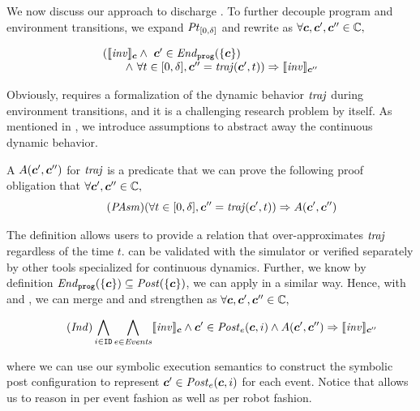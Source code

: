 We now discuss our approach to discharge .
To further decouple program and environment transitions,
we expand $\mathit{Pt}_{[0,\delta]}$  and rewrite  as $\forall \mathit{\boldsymbol{c}}, \mathit{\boldsymbol{c}}', \mathit{\boldsymbol{c}}'' \in \mathbb{C},$
\begin{small}
\begin{equation}\label{po:ind-hyp-traj}
\begin{array}{l}
(\llbracket\mathit{inv}\rrbracket_{\mathit{\boldsymbol{c}}} \land\ \mathit{\boldsymbol{c}}' \in \mathit{End}_{\mathtt{prog}}(\left\{\mathit{\boldsymbol{c}}\right\})\\
\qquad  \land\ \forall t \in [0, \delta], \mathit{\boldsymbol{c}}'' = \mathit{traj}(\mathit{\boldsymbol{c}}', t)) \Rightarrow \llbracket\mathit{inv}\rrbracket_{\mathit{\boldsymbol{c}}''}
\end{array}
\end{equation}
\end{small}%
Obviously,  requires a formalization of the dynamic behavior $\mathit{traj}$ during environment transitions,
and it is a challenging research problem by itself.
As mentioned in ,
we introduce assumptions to abstract away the continuous dynamic behavior.
\begin{definition}
A \emph{\portasum} $A(\mathit{\boldsymbol{c}}', \mathit{\boldsymbol{c}}'')$ for $\mathit{traj}$ is a predicate that
we can prove the following proof obligation that $\forall \mathit{\boldsymbol{c}}', \mathit{\boldsymbol{c}}'' \in \mathbb{C},$
\begin{equation}\label{po:port-asm}\tag{\textit{PAsm}}
(\forall t \in [0,\delta], \gconfig'' = \traj(\gconfig', t)) \Rightarrow A(\gconfig', \gconfig'')
\end{equation}
\end{definition}
The definition allows users to provide a relation that over-approximates $\mathit{traj}$ regardless of the time $t$.
 can be validated with the \toolname simulator or verified separately by other tools specialized for continuous dynamics.
Further, we know by definition $\mathit{End}_{\mathtt{prog}}(\left\{\mathit{\boldsymbol{c}}\right\}) \subseteq \mathit{Post}(\left\{\mathit{\boldsymbol{c}}\right\})$,
we can apply  in a similar way.
Hence, with  and ,
we can merge  and  and strengthen as
$\forall \mathit{\boldsymbol{c}}, \mathit{\boldsymbol{c}}', \mathit{\boldsymbol{c}}'' \in \mathbb{C},$
\begin{small}
\begin{equation}\label{po:ind}\tag{\textit{Ind}}
\bigwedge_{i\in \UINS} \bigwedge_{\Ev \in \Event} \eec{\Inv}{\gconfig} \land \gconfig' \in \Post_\Ev(\gconfig, i)
\land A(\gconfig', \gconfig'')
\Rightarrow \eec{\Inv}{\gconfig''}
\end{equation}
\end{small}%
where we can use our \K symbolic execution semantics to construct the symbolic post configuration
to represent $\mathit{\boldsymbol{c}}' \in \mathit{Post}_e(\mathit{\boldsymbol{c}}, i)$ for each event.
Notice that  allows us to reason in per event fashion as well as per robot fashion.

